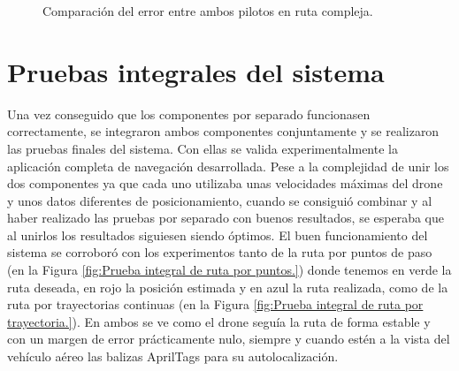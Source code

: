 \begin{figure}[H]
 \centering
 \caption{Comparación del error entre ambos pilotos en ruta compleja.}
 \label{f:Comparativa del error compleja.}
\end{figure} 

\section{Pruebas integrales del sistema}
\hspace{1cm} Una vez conseguido que los componentes por separado funcionasen correctamente, se integraron ambos componentes conjuntamente y se realizaron las pruebas finales del sistema. Con ellas se valida experimentalmente la aplicación completa de navegación desarrollada. Pese a la complejidad de unir los dos componentes ya que cada uno utilizaba unas velocidades máximas del drone y unos datos diferentes de posicionamiento, cuando se consiguió combinar y al haber realizado las pruebas por separado con buenos resultados, se esperaba que al unirlos los resultados siguiesen siendo óptimos. El buen funcionamiento del sistema se corroboró con los experimentos tanto de la ruta por puntos de paso (en la Figura \ref{fig:Prueba integral de ruta por puntos.}) donde tenemos en verde la ruta deseada, en rojo la posición estimada y en azul la ruta realizada, como de la ruta por trayectorias continuas (en la Figura \ref{fig:Prueba integral de ruta por trayectoria.}). En ambos se ve como el drone seguía la ruta de forma estable y con un margen de error prácticamente nulo, siempre y cuando estén a la vista del vehículo aéreo las balizas AprilTags para su autolocalización. 

